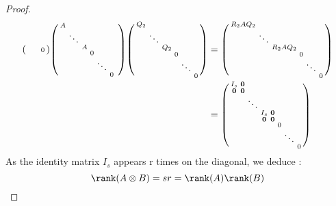\documentclass[11pt]{article}
\newcommand{\kp}{\otimes} %
\begin{document}
\begin{proof}
\begin{align*}
\begin{psmallmatrix}
    & & & & & 0
    \end{psmallmatrix}
    \begin{psmallmatrix}
    A & & & & & &\\
    & \ddots & & & &\\
    & & A & & & &\\
    & & & 0 & & \\
    & & & & \ddots &\\
    & & & & & 0\\
    \end{psmallmatrix}
    \begin{psmallmatrix}
    Q_2 & & & & & \\
    & \ddots & & & & \\
    & & Q_2 & & &\\
    & & & 0 & &\\
    & & & & \ddots &\\
    & & & & & 0
    \end{psmallmatrix}
    &= \begin{psmallmatrix}
    R_2AQ_2 & & & & & \\
    & \ddots & & & & \\
    & & R_2AQ_2 & & &\\
    & & & 0 & &\\
    & & & & \ddots &\\
    & & & & & 0    
    \end{psmallmatrix}\\
    &= \begin{psmallmatrix}
    I_s & \bm{0} & & & & & \\
    \bm{0} & \bm{0} & & & & &\\
    & & \ddots & & & &\\
    & & & I_s & \bm{0} & & &\\
    & & & \bm{0} & \bm{0} & & &\\
    & & & & & 0 & &\\
    & & & & & & \ddots &\\
    & & & & & & & 0 
    \end{psmallmatrix}
\end{align*}
As the identity matrix $I_s$ appears r times on the diagonal, we deduce :
\begin{equation*}
    \rank(A\kp B)=sr=\rank(A)\rank(B)
\end{equation*}
\end{proof}
\end{document}
